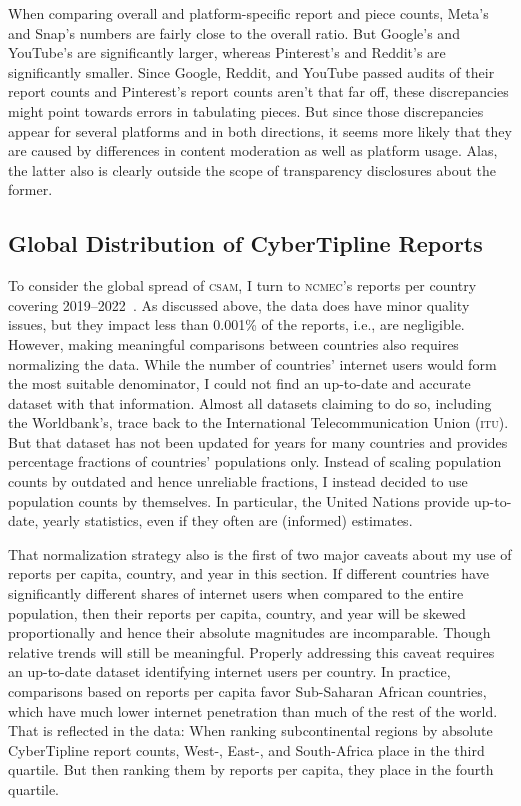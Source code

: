 \documentclass[nonacm,screen]{acmart}
\newcommand\V[1]{\textsc{\MakeLowercase{#1}}}
\begin{document}
When comparing overall and platform-specific report and piece counts, Meta's and
Snap's numbers are fairly close to the overall ratio. But Google's and YouTube's
are significantly larger, whereas Pinterest's and Reddit's are significantly
smaller. Since Google, Reddit, and YouTube passed audits of their report counts
and Pinterest's report counts aren't that far off, these discrepancies might
point towards errors in tabulating pieces. But since those discrepancies appear
for several platforms and in both directions, it seems more likely that they are
caused by differences in content moderation as well as platform usage. Alas, the
latter also is clearly outside the scope of transparency disclosures about the
former.


\subsection{Global Distribution of CyberTipline Reports}
\label{sec:spread}

To consider the global spread of \V{CSAM}, I turn to \V{NCMEC}'s reports per
country covering 2019--2022~\cite{NcmecByCountry2019,NcmecByCountry2020,
NcmecByCountry2021,NcmecByCountry2020}. As discussed above, the data does have
minor quality issues, but they impact less than 0.001\% of the reports, i.e.,
are negligible. However, making meaningful comparisons between countries also
requires normalizing the data. While the number of countries' internet users
would form the most suitable denominator, I could not find an up-to-date and
accurate dataset with that information. Almost all datasets claiming to do so,
including the Worldbank's, trace back to the International Telecommunication
Union (\V{ITU}). But that dataset has not been updated for years for many
countries and provides percentage fractions of countries' populations only.
Instead of scaling population counts by outdated and hence unreliable fractions,
I instead decided to use population counts by themselves. In particular, the
United Nations provide up-to-date, yearly statistics, even if they often are
(informed) estimates.

That normalization strategy also is the first of two major caveats about my use
of reports per capita, country, and year in this section. If different countries
have significantly different shares of internet users when compared to the
entire population, then their reports per capita, country, and year will be
skewed proportionally and hence their absolute magnitudes are incomparable.
Though relative trends will still be meaningful. Properly addressing this caveat
requires an up-to-date dataset identifying internet users per country. In
practice, comparisons based on reports per capita favor Sub-Saharan African
countries, which have much lower internet penetration than much of the rest of
the world. That is reflected in the data: When ranking subcontinental regions by
absolute CyberTipline report counts, West-, East-, and South-Africa place in the
third quartile. But then ranking them by reports per capita, they place in the
fourth quartile.
\end{document}
